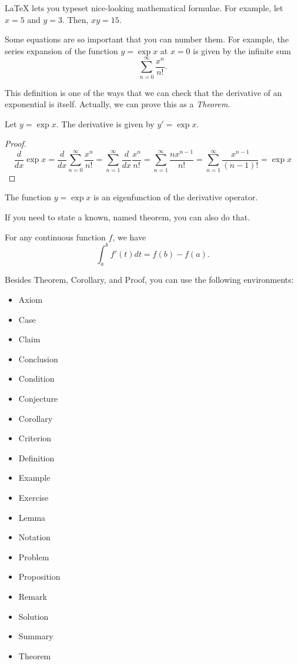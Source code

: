 \documentclass[12pt,reqno,twoside]{amsbook}
\begin{document}
LaTeX lets you typeset nice-looking mathematical formulae. For example, let $x = 5$ and $y = 3$. Then, $xy = 15$.

Some equations are so important that you can number them. For example, the series expansion of the function $y = \exp{x}$ at $x=0$ is given by the infinite sum
\begin{equation}
    \sum_{n=0}^{\infty} \frac{x^n}{n!}.
\end{equation}

This definition is one of the ways that we can check that the derivative of an exponential is itself. Actually, we can prove this as a \textit{Theorem}.

\begin{theorem}
    Let $y = \exp{x}$. The derivative is given by $y' = \exp{x}$.
\end{theorem}

\begin{proof}
\[
\frac{d}{dx} \exp{x} = \frac{d}{dx} \sum_{n=0}^{\infty} \frac{x^n}{n!} = \sum_{n=1}^{\infty} \frac{d}{dx} \frac{x^n}{n!} = \sum_{n=1}^{\infty}  \frac{n x^{n-1}}{n!} = \sum_{n=1}^{\infty}  \frac{x^{n-1}}{(n-1)!} = \exp{x}
\]
\end{proof}

\begin{corollary}
    The function $y=\exp{x}$ is an eigenfunction of the derivative operator.
\end{corollary}

\noindent If you need to state a known, named theorem, you can also do that.

\begin{theorem}
For any continuous function $f$, we have
    \[
    \int_{a}^{b} f'(t) dt = f(b) - f(a).
    \]
\end{theorem}

\noindent Besides Theorem, Corollary, and Proof, you can use the following environments:
\begin{itemize}
    \item Axiom
    \item Case
    \item Claim
    \item Conclusion
    \item Condition
    \item Conjecture
    \item Corollary
    \item Criterion
    \item Definition
    \item Example
    \item Exercise
    \item Lemma
    \item Notation
    \item Problem
    \item Proposition
    \item Remark
    \item Solution
    \item Summary
    \item Theorem
\end{itemize}
\end{document}
